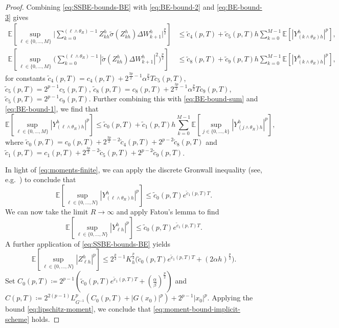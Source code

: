\documentclass[onseside, final]{amsart}
\theoremstyle{definition}
\newcommand{\E}{\mathbb E}
\numberwithin{equation}{section}
\begin{document}
\begin{proof}
			 Combining \eqref{eq:SSBE-bounds-BE} with \eqref{eq:BE-bound-2} and \eqref{eq:BE-bound-3} gives
			 \begin{equation}
			 	\begin{split}
			 		\E \!\left[\sup_{\ell \in \{0, \dotsc, M\}}\bigg | \sum_{k = 0}^{(\ell \wedge \theta_R) - 1} Z^h_{kh} \tilde \sigma(Z^h_{kh}) \Delta W^h_{k + 1}\bigg |^{\frac p2}\right]\! & \leq \tilde c_4(p, T) + \tilde c_5(p, T) h \sum_{k = 0}^{M - 1}\E[|Y^h_{(k \wedge \theta_R)h}|^p],\\
			 		\E\!\left[\sup_{\ell \in \{0, \dotsc, M\}}\bigg(\sum_{k = 0}^{(\ell \wedge \theta_R) - 1}|\tilde \sigma(Z^h_{kh}) \Delta W^h_{k + 1}|^2\bigg)^{\frac p2}\right]\! & \leq \tilde c_8(p, T) + \tilde c_9(p, T)h\sum_{k = 0}^{M - 1}\E[|Y^h_{(k \wedge \theta_R)h}|^p],
			 	\end{split}
			 \end{equation}
			 for constants $\tilde c_4(p, T) = c_4(p,T) + 2^{\frac{3p}{2} - 1}\alpha^{\frac p2} T c_5(p, T)$, $\tilde c_5(p, T) = 2^{p - 1}c_5(p, T)$, $\tilde c_8(p, T) = c_8(p,T) + 2^{\frac{3p}{2} - 1} \alpha^{\frac p2} T c_9(p, T)$, $\tilde c_5(p, T) = 2^{p - 1}c_9(p, T)$. Further combining this with \eqref{eq:BE-bound-sum} and \eqref{eq:BE-bound-1}, we find that
			 \begin{equation}\label{eq:discrete-gronwall}
			 	\E \!\left[\sup_{\ell \in \{0, \dotsc, M\}} |Y^h_{(\ell \wedge \theta_R) h}|^p\right]\! \leq \tilde c_0(p, T) + \tilde c_1(p, T)h \sum_{k = 0}^{M - 1}\E\!\left[\sup_{j \in \{0, \dotsc, k \}}|Y^h_{(j \wedge \theta_R)h}|^p\right]\!,
			 \end{equation}
			 where $\tilde c_0(p, T) = c_0(p, T) + 2^{\frac{3p}{2} - 2}\tilde c_4(p, T) + 2^{p - 2}\tilde c_8(p, T)$ and $\tilde c_1(p, T) = c_1(p, T) + 2^{\frac{3p}{2} - 2}\tilde c_5(p, T) + 2^{p - 2}\tilde c_9(p, T)$.
			
			In light of \eqref{eq:moments-finite}, we can apply the discrete Gronwall inequality (see, e.g.~\citep[Lemma 3.4]{MaSz13a}) to conclude that
			 \begin{equation}
			 	\E \!\left[\sup_{\ell \in \{0, \dotsc, N\}} |Y^h_{(\ell \wedge \theta_R)h}|^p\right]\! \leq \tilde c_0(p, T)e^{\tilde c_1(p, T)T}.
			 \end{equation}
			 We can now take the limit $R \to \infty$ and apply Fatou's lemma to find
			  \begin{equation}
			 	\E \!\left[\sup_{\ell \in \{0, \dotsc, N\}} |Y^h_{\ell h}|^p\right]\! \leq \tilde c_0(p, T)e^{\tilde c_1(p, T)T}.
			 \end{equation}
			 A further application of \eqref{eq:SSBE-bounds-BE} yields
			 \begin{equation}
			 	\E \!\left[\sup_{\ell \in \{0, \dotsc, N\}} |Z^h_{\ell h}|^p\right]\! \leq 2^{\frac p2 - 1}K_h^{\frac p2}\Big(\tilde c_0(p, T)e^{\tilde c_1(p, T)T} + (2\alpha h)^{\frac p2}\Big).
			 \end{equation}
			 Set $C_0(p, T) \coloneqq 2^{p - 1}(\tilde c_0(p, T)e^{\tilde c_1(p, T)T} + (\tfrac{\alpha}{\beta})^{\frac p2})$ and $C(p, T) \coloneqq 2^{2(p - 1)}L_{G^{-1}}^p (C_0(p, T) + |G(x_0)|^p) + 2^{p - 1}|x_0|^p$. Applying the bound \eqref{eq:lipschitz-moment}, we conclude that \eqref{eq:moment-bound-implicit-scheme} holds.
			 

\end{proof}
\end{document}
